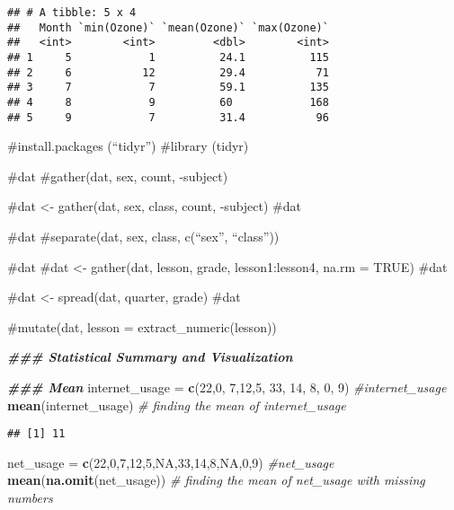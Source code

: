 \documentclass[
]{article}
\newenvironment{Shaded}{\begin{snugshade}}{\end{snugshade}}
\newcommand{\CommentTok}[1]{\textcolor[rgb]{0.56,0.35,0.01}{\textit{#1}}}
\newcommand{\ConstantTok}[1]{\textcolor[rgb]{0.56,0.35,0.01}{#1}}
\newcommand{\DecValTok}[1]{\textcolor[rgb]{0.00,0.00,0.81}{#1}}
\newcommand{\DocumentationTok}[1]{\textcolor[rgb]{0.56,0.35,0.01}{\textbf{\textit{#1}}}}
\newcommand{\FunctionTok}[1]{\textcolor[rgb]{0.13,0.29,0.53}{\textbf{#1}}}
\newcommand{\NormalTok}[1]{#1}
\newcommand{\OtherTok}[1]{\textcolor[rgb]{0.56,0.35,0.01}{#1}}
\begin{document}
\begin{verbatim}
## # A tibble: 5 x 4
##   Month `min(Ozone)` `mean(Ozone)` `max(Ozone)`
##   <int>        <int>         <dbl>        <int>
## 1     5            1          24.1          115
## 2     6           12          29.4           71
## 3     7            7          59.1          135
## 4     8            9          60            168
## 5     9            7          31.4           96
\end{verbatim}

\#install.packages (``tidyr'') \#library (tidyr)

\#dat \#gather(dat, sex, count, -subject)

\#dat \textless- gather(dat, sex, class, count, -subject) \#dat

\#dat \#separate(dat, sex, class, c(``sex'', ``class''))

\#dat \#dat \textless- gather(dat, lesson, grade, lesson1:lesson4, na.rm
= TRUE) \#dat

\#dat \textless- spread(dat, quarter, grade) \#dat

\#mutate(dat, lesson = extract\_numeric(lesson))

\begin{Shaded}
\begin{Highlighting}[]
\DocumentationTok{\#\#\# Statistical Summary and Visualization}

\DocumentationTok{\#\#\# Mean}
\NormalTok{internet\_usage }\OtherTok{=} \FunctionTok{c}\NormalTok{(}\DecValTok{22}\NormalTok{,}\DecValTok{0}\NormalTok{, }\DecValTok{7}\NormalTok{,}\DecValTok{12}\NormalTok{,}\DecValTok{5}\NormalTok{, }\DecValTok{33}\NormalTok{, }\DecValTok{14}\NormalTok{, }\DecValTok{8}\NormalTok{, }\DecValTok{0}\NormalTok{, }\DecValTok{9}\NormalTok{)}
\CommentTok{\#internet\_usage}
\FunctionTok{mean}\NormalTok{(internet\_usage) }\CommentTok{\# finding the mean of internet\_usage}
\end{Highlighting}
\end{Shaded}

\begin{verbatim}
## [1] 11
\end{verbatim}

\begin{Shaded}
\begin{Highlighting}[]
\NormalTok{net\_usage }\OtherTok{=} \FunctionTok{c}\NormalTok{(}\DecValTok{22}\NormalTok{,}\DecValTok{0}\NormalTok{,}\DecValTok{7}\NormalTok{,}\DecValTok{12}\NormalTok{,}\DecValTok{5}\NormalTok{,}\ConstantTok{NA}\NormalTok{,}\DecValTok{33}\NormalTok{,}\DecValTok{14}\NormalTok{,}\DecValTok{8}\NormalTok{,}\ConstantTok{NA}\NormalTok{,}\DecValTok{0}\NormalTok{,}\DecValTok{9}\NormalTok{)}
\CommentTok{\#net\_usage}
\FunctionTok{mean}\NormalTok{(}\FunctionTok{na.omit}\NormalTok{(net\_usage)) }\CommentTok{\# finding the mean of net\_usage with missing numbers }
\end{Highlighting}
\end{Shaded}
\end{document}
